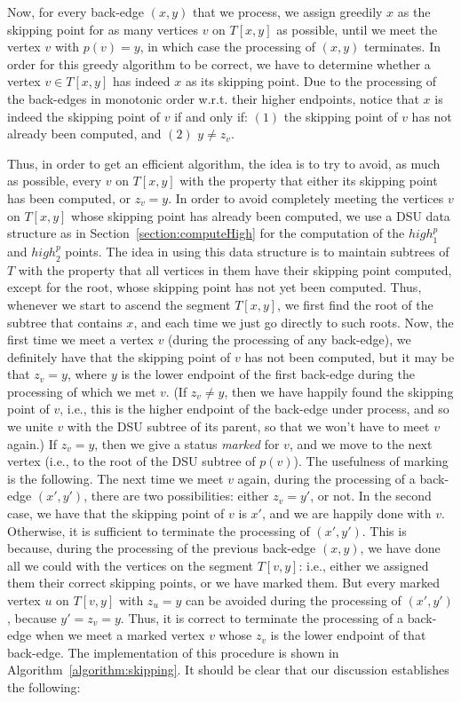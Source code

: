 \documentclass[11pt,a4paper]{article}
\begin{document}
Now, for every back-edge $(x,y)$ that we process, we assign greedily $x$ as the skipping point for as many vertices $v$ on $T[x,y]$ as possible, until we meet the vertex $v$ with $p(v)=y$, in which case the processing of $(x,y)$ terminates. In order for this greedy algorithm to be correct, we have to determine whether a vertex $v\in T[x,y]$ has indeed $x$ as its skipping point. Due to the processing of the back-edges in monotonic order w.r.t. their higher endpoints, notice that $x$ is indeed the skipping point of $v$ if and only if: $(1)$ the skipping point of $v$ has not already been computed, and $(2)$ $y\neq z_v$.

Thus, in order to get an efficient algorithm, the idea is to try to avoid, as much as possible, every $v$ on $T[x,y]$ with the property that either its skipping point has been computed, or $z_v=y$. In order to avoid completely meeting the vertices $v$ on $T[x,y]$ whose skipping point has already been computed, we use a DSU data structure as in Section~\ref{section:computeHigh} for the computation of the $\mathit{high}^p_1$ and $\mathit{high}^p_2$ points. The idea in using this data structure is to maintain subtrees of $T$ with the property that all vertices in them have their skipping point computed, except for the root, whose skipping point has not yet been computed. Thus, whenever we start to ascend the segment $T[x,y]$, we first find the root of the subtree that contains $x$, and each time we just go directly to such roots. Now, the first time we meet a vertex $v$ (during the processing of any back-edge), we definitely have that the skipping point of $v$ has not been computed, but it may be that $z_v=y$, where $y$ is the lower endpoint of the first back-edge during the processing of which we met $v$. (If $z_v\neq y$, then we have happily found the skipping point of $v$, i.e., this is the higher endpoint of the back-edge under process, and so we unite $v$ with the DSU subtree of its parent, so that we won't have to meet $v$ again.) If $z_v=y$, then we give a status \emph{marked} for $v$, and we move to the next vertex (i.e., to the root of the DSU subtree of $p(v)$). The usefulness of marking is the following. The next time we meet $v$ again, during the processing of a back-edge $(x',y')$, there are two possibilities: either $z_v=y'$, or not. In the second case, we have that the skipping point of $v$ is $x'$, and we are happily done with $v$. Otherwise, it is sufficient to terminate the processing of $(x',y')$. This is because, during the processing of the previous back-edge $(x,y)$, we have done all we could with the vertices on the segment $T[v,y]$: i.e., either we assigned them their correct skipping points, or we have marked them. But every marked vertex $u$ on $T[v,y]$ with $z_u=y$ can be avoided during the processing of $(x',y')$, because $y'=z_v=y$. Thus, it is correct to terminate the processing of a back-edge when we meet a marked vertex $v$ whose $z_v$ is the lower endpoint of that back-edge. The implementation of this procedure is shown in Algorithm~\ref{algorithm:skipping}. It should be clear that our discussion establishes the following:
\end{document}
